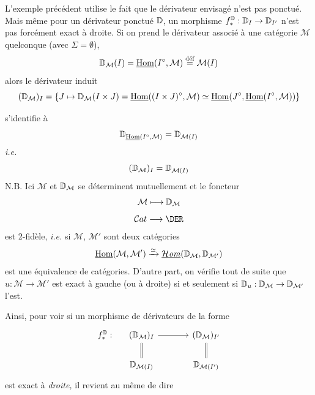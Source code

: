 L'exemple précédent utilise le fait que le dérivateur envisagé n'est pas ponctué. Mais même pour un dérivateur ponctué $\mathbb{D}$, un morphisme $f^{\mathbb{D}}_* : \mathbb{D}_I \to \mathbb{D}_{I'}$ n'est pas forcément exact à droite. Si on prend le dérivateur associé à une catégorie $\mathcal{M}$ quelconque (avec $\Sigma = \emptyset$),
\[
\mathbb{D}_{\mathcal{M}}(I) = \underline{\operatorname{Hom}}(I^\circ,\mathcal{M}) \overset{\text{déf}}{=} \mathcal{M}(I)
\]
alors le dérivateur induit
\[
(\mathbb{D}_{\mathcal{M}})_I = \{J \mapsto \mathbb{D}_{\mathcal{M}}(I \times J) = \underline{\operatorname{Hom}}((I \times J)^\circ,\mathcal{M}) \simeq \underline{\operatorname{Hom}}(J^\circ,\underline{\operatorname{Hom}}(I^\circ,\mathcal{M}))\}
\]


s'identifie à
\[
\mathbb{D}_{\underline{\operatorname{Hom}}(I^\circ,\mathcal{M})} = \mathbb{D}_{\mathcal{M}(I)}
\]
\textit{i.e.}
\[
(\mathbb{D}_{\mathcal{M}})_I = \mathbb{D}_{\mathcal{M}(I)}
\]
N.B. Ici $\mathcal{M}$ et $\mathbb{D}_{\mathcal{M}}$ se déterminent mutuellement et le foncteur
\[
\mathcal{M} \longmapsto \mathbb{D}_{\mathcal{M}}
\]
\[
\Cat \longrightarrow \DER
\]
est 2-fidèle, \textit{i.e.} si $\mathcal{M}$, $\mathcal{M}'$ sont deux catégories
\[
\underline{\operatorname{Hom}}(\mathcal{M},\mathcal{M}') \xrightarrow{\simeq} \underline{\mathcal{H}\mathit{om}}(\mathbb{D}_{\mathcal{M}},\mathbb{D}_{\mathcal{M}'})
\]
est une équivalence de catégories. D'autre part, on vérifie tout de suite que $u : \mathcal{M} \to \mathcal{M}'$ est exact à gauche (ou à droite) si et seulement si $\mathbb{D}_u : \mathbb{D}_{\mathcal{M}} \to \mathbb{D}_{\mathcal{M}'}$ l'est.

Ainsi, pour voir si un morphisme de dérivateurs de la forme
\[
\begin{tikzcd}[column sep=large, row sep=normal]
f^{\D}_* : &[-2.5em] (\D_{\mathcal{M}})_I \arrow[r] \arrow[d, equal] & (\D_{\mathcal{M}})_{I'} \arrow[d, equal] \\
& \D_{\mathcal{M}(I)} & \D_{\mathcal{M}(I')}
\end{tikzcd}
\]
est exact à \textit{droite,} il revient au même de dire

